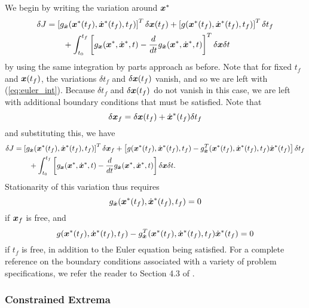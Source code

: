 We begin by writing the variation around $\bm{x}^*$
\begin{align}
\delta J &= \left[ g_{\dot{\bm{x}}}(\bm{x}^*(t_f),\dot{\bm{x}}^*(t_f),t_f) \right]^T \delta \bm{x}(t_f) + 
\left[ g(\bm{x}^*(t_f),\dot{\bm{x}}^*(t_f),t_f) \right]^T \delta t_f\\
& \qquad + \int_{t_0}^{t_f} \left[ g_{\bm{x}}(\bm{x}^*,\dot{\bm{x}}^*,t) - \frac{d}{dt} g_{\dot{\bm{x}}}(\bm{x}^*,\dot{\bm{x}}^*,t)\right]^T \delta \bm{x} \delta t \nonumber
\end{align}
by using the same integration by parts approach as before. Note that for fixed $t_f$ and $\bm{x}(t_f)$, the variations $\delta t_f$ and $\delta \bm{x}(t_f)$ vanish, and so we are left with (\ref{eq:euler_int}). Because $\delta t_f$ and $\delta \bm{x}(t_f)$ do not vanish in this case, we are left with additional boundary conditions that must be satisfied. Note that 
\begin{equation}
    \delta \bm{x}_f = \delta \bm{x}(t_f) + \dot{\bm{x}}^*(t_f) \delta t_f
\end{equation}
and substituting this, we have
\begin{align}
\delta J &= \left[ g_{\dot{\bm{x}}}(\bm{x}^*(t_f),\dot{\bm{x}}^*(t_f),t_f) \right]^T \delta \bm{x}_f + 
\left[ g(\bm{x}^*(t_f),\dot{\bm{x}}^*(t_f),t_f) - g^T_{\dot{\bm{x}}}(\bm{x}^*(t_f),\dot{\bm{x}}^*(t_f),t_f) \dot{\bm{x}}^*(t_f) \right] \delta t_f\\
& \qquad + \int_{t_0}^{t_f} \left[ g_{\bm{x}}(\bm{x}^*,\dot{\bm{x}}^*,t) - \frac{d}{dt} g_{\dot{\bm{x}}}(\bm{x}^*,\dot{\bm{x}}^*,t)\right] \delta \bm{x} \delta t \nonumber.
\end{align}
Stationarity of this variation thus requires 
\begin{equation}
    g_{\dot{\bm{x}}}(\bm{x}^*(t_f),\dot{\bm{x}}^*(t_f),t_f) = 0
\end{equation} 
if $\bm{x}_f$ is free, and 
\begin{equation}
    g(\bm{x}^*(t_f),\dot{\bm{x}}^*(t_f),t_f) - g^T_{\dot{\bm{x}}}(\bm{x}^*(t_f),\dot{\bm{x}}^*(t_f),t_f) \dot{\bm{x}}^*(t_f) = 0
\end{equation}
if $t_f$ is free, in addition to the Euler equation being satisfied. For a complete reference on the boundary conditions associated with a variety of problem specifications, we refer the reader to Section 4.3 of \cite{kirk2012optimal}.


\subsubsection{Constrained Extrema}

